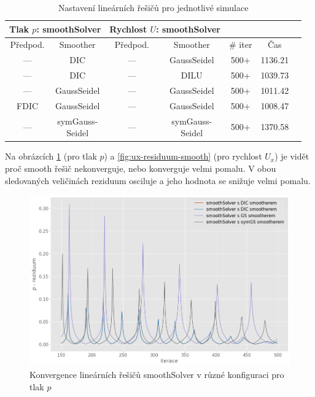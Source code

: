 \documentclass[a4paper,12pt]{report}
\theoremstyle{remark}
\begin{document}
 \begin{table}[H]
	\centering
	\caption{Nastavení lineárních řešičů pro jednotlivé simulace}
	\renewcommand{\arraystretch}{1.9}
	\begin{tabular}{*7c}
		\toprule
\multicolumn{2}{c}{Tlak $p$: \textbf{smoothSolver}} & \multicolumn{2}{c}{Rychlost $U$: \textbf{smoothSolver}}\\
\midrule
Předpod.&Smoother&Předpod.&Smoother&\# iter&Čas\\
\midrule		
 --- & DIC &  --- & GaussSeidel &500+&1136.21\\	
 --- & DIC & --- & DILU &500+&1039.73\\
 --- & GaussSeidel &   --- & GaussSeidel &500+&1011.42\\		
 FDIC & GaussSeidel &  --- & GaussSeidel &500+&1008.47\\
 --- & \shortstack{symGauss-\\Seidel} &  --- & \shortstack{symGauss-\\Seidel}&500+&1370.58\\	
\bottomrule
\end{tabular}
	
	\label{table:solvers_smooth}
\end{table}

Na obrázcích \ref{fig:p-residuum-smooth} (pro tlak $p$) a \ref{fig:ux-residuum-smooth} (pro rychlost $U_x$) je vidět proč smooth řešič nekonverguje, nebo konverguje velmi pomalu. V obou sledovaných veličinách reziduum osciluje a jeho hodnota se snižuje velmi pomalu.

\begin{figure}[H]
	\centering
	\includegraphics[width=1\linewidth]{p-residuum-smooth.png}
	\caption{Konvergence lineárních řešičů smoothSolver v různé konfiguraci pro tlak $p$}
	\label{fig:p-residuum-smooth}
\end{figure}
\end{document}
